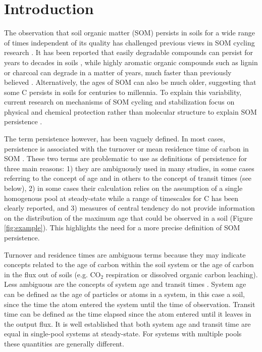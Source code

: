\documentclass[draft,linenumbers]{agujournal}
\begin{document}
\section{Introduction}
The observation that soil organic matter (SOM) persists in soils for a wide range of times independent of its quality has challenged previous views in SOM cycling research \citep{Kleber2010, Schmidt2011, Dungait2012, Gleixner2013, Paul2016}. It has been reported that easily degradable compounds can persist for years to decades in soils \citep{Kiem2003, Kleber2010}, while highly aromatic organic compounds such as lignin or charcoal can degrade in a matter of years, much faster than previously believed \citep{Gleixner1999, Kleber2010, Heim2007, Lehmann2015}. Alternatively, the ages of SOM can also be much older, suggesting that some C persists in soils for centuries to millennia. To explain this variability, current research on mechanisms of SOM cycling and stabilization focus on physical and chemical protection rather than molecular structure to explain SOM persistence \citep{Schmidt2011, LehmannKleber}. 

The term persistence however, has been vaguely defined. In most cases, persistence is associated with the turnover or mean residence time of carbon in SOM \citep{Schmidt2011, Derrien2011, Lehmann2015}. These two terms are problematic to use as definitions of persistence for three main reasons: 1) they are ambiguously used in many studies, in some cases referring to the concept of age and in others to the concept of transit times (see below), 2) in some cases their calculation relies on the assumption of a single homogenous pool at steady-state while a range of timescales for C has been clearly reported, and 3) measures of central tendency do not provide information on the distribution of the maximum age that could be observed in a soil (Figure \ref{fig:example}). This highlights the need for a more precise definition of SOM persistence. %

Turnover and residence times are ambiguous terms because they may indicate concepts related to the age of carbon within the soil system or the age of carbon in the flux out of soils (e.g. CO$_2$ respiration or dissolved organic carbon leaching). Less ambiguous are the concepts of system age and transit times \citep{Bolin1973, Bruun2004, Derrien2011, Manzoni2009, Sierra2017}. System age can be defined as the age of particles or atoms in a system, in this case a soil, since the time the atom entered the system until the time of observation. Transit time can be defined as the time elapsed since the atom entered until it leaves in the output flux. It is well established that both system age and transit time are equal in single-pool systems at steady-state. For systems with multiple pools these quantities are generally different. 
 
\end{document}
